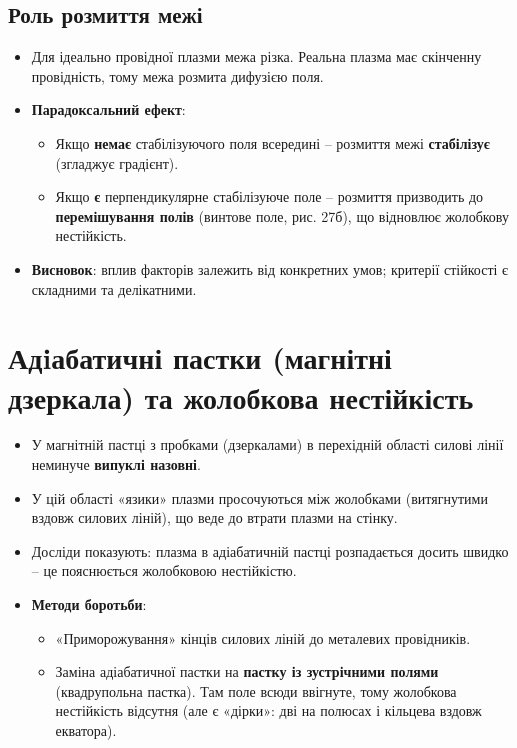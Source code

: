 \documentclass[a4paper,12pt]{article}
\begin{document}
\subsection{Роль розмиття межі}

\begin{itemize}
    \item Для ідеально провідної плазми межа різка. Реальна плазма має скінченну провідність, тому межа розмита дифузією поля.
    \item \textbf{Парадоксальний ефект}:
    \begin{itemize}
        \item Якщо \textbf{немає} стабілізуючого поля всередині – розмиття межі \textbf{стабілізує} (згладжує градієнт).
        \item Якщо \textbf{є} перпендикулярне стабілізуюче поле – розмиття призводить до \textbf{перемішування полів} (винтове поле, рис. 27б), що відновлює жолобкову нестійкість.
    \end{itemize}
    \item \textbf{Висновок}: вплив факторів залежить від конкретних умов; критерії стійкості є складними та делікатними.
\end{itemize}

\section{Адiабатичні пастки (магнітні дзеркала) та жолобкова нестійкість}

\begin{itemize}
    \item У магнітній пастці з пробками (дзеркалами) в перехідній області силові лінії неминуче \textbf{випуклі назовні}.
    \item У цій області «язики» плазми просочуються між жолобками (витягнутими вздовж силових ліній), що веде до втрати плазми на стінку.
    \item Досліди показують: плазма в адіабатичній пастці розпадається досить швидко – це пояснюється жолобковою нестійкістю.
    \item \textbf{Методи боротьби}:
    \begin{itemize}
        \item «Приморожування» кінців силових ліній до металевих провідників.
        \item Заміна адіабатичної пастки на \textbf{пастку із зустрічними полями} (квадрупольна пастка). Там поле всюди ввігнуте, тому жолобкова нестійкість відсутня (але є «дірки»: дві на полюсах і кільцева вздовж екватора).
    \end{itemize}
\end{itemize}
\end{document}

